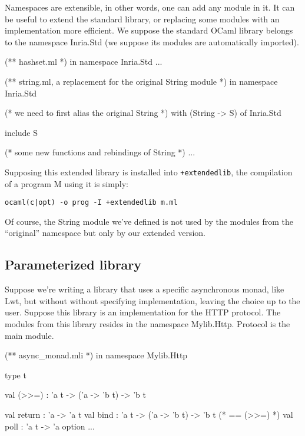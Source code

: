 \documentclass[11pt,a4paper]{article}
\begin{document}
Namespaces are extensible, in other words, one can add any module in it. It can
be useful to extend the standard library, or replacing some modules with an
implementation more efficient. We suppose the standard OCaml library belongs to
the namespace Inria.Std (we suppose its modules are automatically
imported).

\begin{OCaml}
(** hashset.ml *)
in namespace Inria.Std
...
\end{OCaml}

\begin{OCaml}
(** string.ml, a replacement for the original String module *)
in namespace Inria.Std

(* we need to first alias the original String *)
  with (String -> S) of Inria.Std

include S

(* some new functions and rebindings of String *)
...
\end{OCaml}

Supposing this extended library is installed into \texttt{+extendedlib}, the
compilation of a program M using it is simply:
\begin{verbatim}
ocaml(c|opt) -o prog -I +extendedlib m.ml
\end{verbatim}

Of course, the String module we've defined is not used by the modules from the
``original'' namespace but only by our extended version.

\subsection{Parameterized library}

Suppose we're writing a library that uses a specific asynchronous monad, like
Lwt, but without without specifying implementation, leaving the choice up to the
user. Suppose this library is an implementation for the HTTP protocol. The modules
from this library resides in the namespace Mylib.Http. Protocol is the main module.

\begin{OCaml}
(** async_monad.mli *)
in namespace Mylib.Http

type t

val (>>=) : 'a t -> ('a -> 'b t) -> 'b t

val return : 'a -> 'a t
val bind : 'a t -> ('a -> 'b t) -> 'b t (* == (>>=) *)
val poll : 'a t -> 'a option
...
\end{OCaml}
\end{document}
